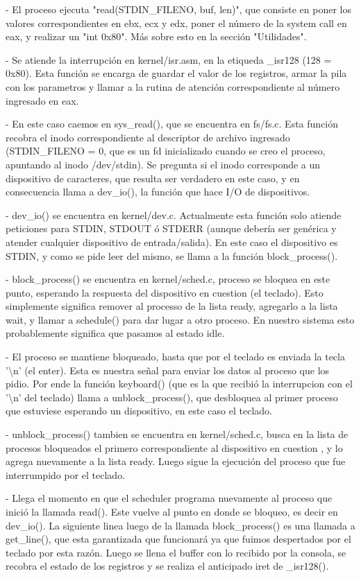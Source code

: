 - El proceso ejecuta "read(STDIN\_FILENO, buf, len)", que consiste en poner los
valores correspondientes en ebx, ecx y edx, poner el número de la system call
en eax, y realizar un "int 0x80". Más sobre esto en la sección "Utilidades".

- Se atiende la interrupción en kernel/isr.asm, en la etiqueda \_isr128 (128
= 0x80). Esta función se encarga de guardar el valor de los registros, armar
la pila con los parametros y llamar a la rutina de atención correspondiente
al número ingresado en eax.

- En este caso caemos en sys\_read(), que se encuentra en fs/fs.c. Esta función
recobra el inodo correspondiente al descriptor de archivo ingresado
(STDIN\_FILENO = 0, que es un fd inicializado cuando se creo el proceso,
apuntando al inodo /dev/stdin). Se pregunta si el inodo corresponde a un
dispositivo de caracteres, que resulta ser verdadero en este caso, y en
consecuencia llama a dev\_io(), la función que hace I/O de dispositivos.

- dev\_io() se encuentra en kernel/dev.c. Actualmente esta función solo atiende
peticiones para STDIN, STDOUT ó STDERR (aunque debería ser genérica y atender
cualquier dispositivo de entrada/salida). En este caso el dispositivo es STDIN,
y como se pide leer del mismo, se llama a la función block\_process().

- block\_process() se encuentra en kernel/sched.c, proceso se bloquea en este
punto, esperando la respuesta del dispositivo en cuestion (el teclado). Esto
simplemente significa remover al processo de la lista ready, agregarlo a la
lista wait, y llamar a schedule() para dar lugar a otro proceso. En nuestro
sistema esto probablemente significa que pasamos al estado idle.

- El proceso se mantiene bloqueado, hasta que por el teclado es enviada la
tecla '\textbackslash n' (el enter). Esta es nuestra señal para enviar los
datos al proceso que los pidio. Por ende la función keyboard() (que es la
que recibió la interrupcion con el '\textbackslash n' del teclado) llama a
unblock\_process(), que desbloquea al primer proceso que estuviese esperando
un dispositivo, en este caso el teclado.

- unblock\_process() tambien se encuentra en kernel/sched.c, busca en la lista
de procesos bloqueados el primero correspondiente al dispositivo en cuestion
, y lo agrega nuevamente a la lista ready. Luego sigue la ejecución del proceso
que fue interrumpido por el teclado.

- Llega el momento en que el scheduler programa nuevamente al proceso que
inició la llamada read(). Este vuelve al punto en donde se bloqueo, es decir en
dev\_io(). La siguiente linea luego de la llamada block\_process() es una
llamada a get\_line(), que esta garantizada que funcionará ya que fuimos
despertados por el teclado por esta razón. Luego se llena el buffer con lo
recibido por la consola, se recobra el estado de los registros y se realiza el
anticipado iret de \_isr128().

